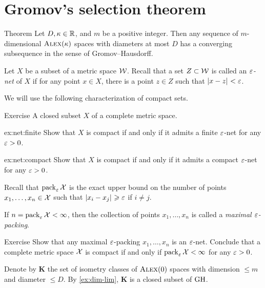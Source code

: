 \section{Gromov's selection theorem}

\begin{thm}{Theorem}\label{thm:gromov-compactness}
Let $D,\kappa\in\mathbb{R}$, and $m$ be a positive integer. 
Then any sequence of $m$-dimensional $\textsc{Alex}(\kappa)$ spaces with diameters at most $D$
has a converging subsequence in the sense of Gromov--Hausdorff.
\end{thm}

Let $X$ be a subset of a metric space $\mathcal{W}$.
Recall that a set $Z\subset \mathcal{W}$ is called an \emph{$\varepsilon$-net} of $X$ if for any point $x\in X$, there is a point $z\in Z$ such that $|{x}-{z}|_{}^{{}}<\varepsilon$.

We will use the following characterization of compact sets.

\begin{thm}{Exercise}\label{ex:net}
A closed subset $X$ of a complete metric space.

\begin{subthm}{ex:net:finite}
Show that $X$ is compact if and only if it admits a finite $\varepsilon$-net for any $\varepsilon>0$.
\end{subthm}

\begin{subthm}{ex:net:compact}
Show that $X$ is compact if and only if it admits a compact $\varepsilon$-net for any $\varepsilon>0$.
\end{subthm}

\end{thm}

Recall that $\operatorname{\rm pack}\nolimits_\varepsilon\mathcal{X}$ is the exact upper bound on the number of points $x_1,\dots,x_n\in \mathcal{X}$ such that $|{x_i}-{x_j}|_{}^{{}}\geqslant\varepsilon$ if $i\ne j$.

If $n=\operatorname{\rm pack}\nolimits_\varepsilon\mathcal{X}<\infty$, then
the collection of points $x_1,\dots,x_n$ is called a \emph{maximal $\varepsilon$-packing}.

\begin{thm}{Exercise}\label{ex:pack-net}
Show that any maximal $\varepsilon$-packing $x_1,\dots,x_n$ is an $\varepsilon$-net.
Conclude that a complete metric space $\mathcal{X}$ is compact if and only if $\operatorname{\rm pack}\nolimits_\varepsilon\mathcal{X}<\infty$ for any $\varepsilon>0$.
\end{thm}


Denote by $\bm{K}$ the set of isometry classes of $\textsc{Alex}(0)$ spaces with dimension $\le m$ and diameter $\le D$.
By \ref{ex:dim-lim}, $\bm{K}$ is a closed subset of $\operatorname{\rm GH}\nolimits$.

